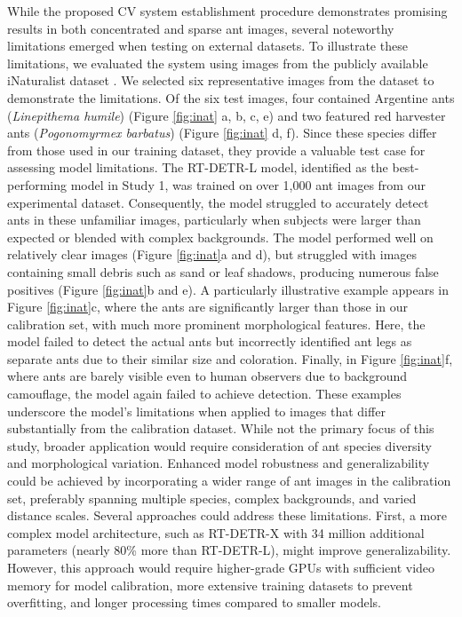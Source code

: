 While the proposed CV system establishment procedure demonstrates promising results in both concentrated and sparse ant images, several noteworthy limitations emerged when testing on external datasets. To illustrate these limitations, we evaluated the system using images from the publicly available iNaturalist dataset \cite{horn_inaturalist_2018}. We selected six representative images from the dataset to demonstrate the limitations. Of the six test images, four contained Argentine ants (\emph{Linepithema humile}) (Figure \ref{fig:inat} a, b, c, e) and two featured red harvester ants (\emph{Pogonomyrmex barbatus}) (Figure \ref{fig:inat} d, f). Since these species differ from those used in our training dataset, they provide a valuable test case for assessing model limitations.
The RT-DETR-L model, identified as the best-performing model in Study 1, was trained on over 1,000 ant images from our experimental dataset. Consequently, the model struggled to accurately detect ants in these unfamiliar images, particularly when subjects were larger than expected or blended with complex backgrounds. The model performed well on relatively clear images (Figure \ref{fig:inat}a and d), but struggled with images containing small debris such as sand or leaf shadows, producing numerous false positives (Figure \ref{fig:inat}b and e). A particularly illustrative example appears in Figure \ref{fig:inat}c, where the ants are significantly larger than those in our calibration set, with much more prominent morphological features. Here, the model failed to detect the actual ants but incorrectly identified ant legs as separate ants due to their similar size and coloration. Finally, in Figure \ref{fig:inat}f, where ants are barely visible even to human observers due to background camouflage, the model again failed to achieve detection.
These examples underscore the model's limitations when applied to images that differ substantially from the calibration dataset. While not the primary focus of this study, broader application would require consideration of ant species diversity and morphological variation. Enhanced model robustness and generalizability could be achieved by incorporating a wider range of ant images in the calibration set, preferably spanning multiple species, complex backgrounds, and varied distance scales.
Several approaches could address these limitations. First, a more complex model architecture, such as RT-DETR-X with 34 million additional parameters (nearly 80\% more than RT-DETR-L), might improve generalizability. However, this approach would require higher-grade GPUs with sufficient video memory for model calibration, more extensive training datasets to prevent overfitting, and longer processing times compared to smaller models.
